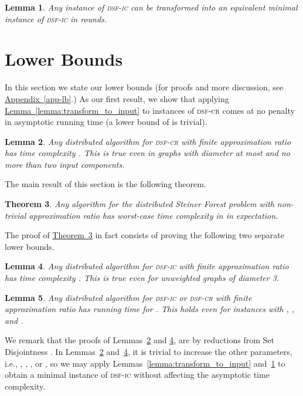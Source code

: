 \documentclass[letterpaper,11pt]{article}
\newtheorem{theorem}{Theorem}[section]
\newtheorem{lemma}[theorem]{Lemma}
\newcommand{\namedref}[2]{\hyperref[#2]{#1~\ref*{#2}}}
\newcommand{\appendixref}[1]{\namedref{Appendix}{#1}}
\newcommand{\theoremref}[1]{\namedref{Theorem}{#1}}
\newcommand{\lemmaref}[1]{\namedref{Lemma}{#1}}
\newcommand{\sfcr}{\textsc{dsf-cr}\xspace}
\newcommand{\sfic}{\textsc{dsf-ic}\xspace}
\begin{document}
\begin{lemma}\label{lemma:transform_to_minimal}
Any instance of \sfic can be transformed into
an equivalent minimal instance of \sfic in  rounds.
\end{lemma}

\section{Lower Bounds}
\label{sec-lb}


In this section we state our lower bounds (for proofs and more
discussion, see \appendixref{app-lb}.) 
As our first result,
we show that applying \lemmaref{lemma:transform_to_input} to
instances of \sfcr comes at no penalty in asymptotic running time (a lower bound
of  is trivial). 
\begin{lemma}
\label{lem-lb1}
  Any distributed algorithm for \sfcr with finite approximation ratio
  has time complexity . This is true even in graphs
  with diameter at most  and no more than two input components.
\end{lemma}

The main result of this section is the following theorem.
\begin{theorem}
\label{thm-lb}
  Any algorithm for the distributed Steiner Forest problem with non-trivial
  approximation ratio has worst-case time complexity in
   in expectation.
\end{theorem}
The proof of \theoremref{thm-lb} in fact consists of proving the following two
separate lower bounds.



\begin{lemma}\label{lem:lower_k}
  Any distributed algorithm for \sfic with finite approximation ratio
  has time complexity . This is true even for
  unweighted graphs of diameter 3.
\end{lemma}

\begin{lemma}\label{lem:lower_s}
  Any distributed algorithm for \sfic or \sfcr with finite approximation ratio
  has running time  for . This holds  even for instances with , ,
  and .
\end{lemma}

We remark that the proofs of Lemmas~\ref{lem-lb1} and  \ref{lem:lower_k},
are by reductions from Set Disjointness
\cite{KushilevitzN-book}.
In Lemmas~\ref{lem-lb1} and~\ref{lem:lower_k}, it is trivial to increase the
other parameters, i.e., , , , or , so we may apply
Lemmas~\ref{lemma:transform_to_input} and~\ref{lemma:transform_to_minimal} to
obtain a minimal instance of \sfic without affecting the asymptotic time
complexity.
\end{document}
